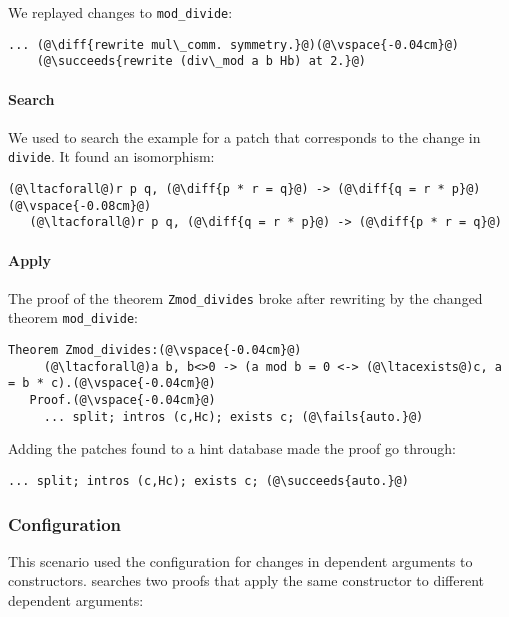 We replayed changes to \lstinline{mod_divide}:

\begin{lstlisting}[language=coq]
    ... (@\diff{rewrite mul\_comm. symmetry.}@)(@\vspace{-0.04cm}@)
    (@\succeeds{rewrite (div\_mod a b Hb) at 2.}@)
\end{lstlisting}

\paragraph{Search} We used \sysname to search the example for a patch
that corresponds to the change in \lstinline{divide}.
It found an isomorphism:

\begin{lstlisting}[language=coq]
   (@\ltacforall@)r p q, (@\diff{p * r = q}@) -> (@\diff{q = r * p}@)(@\vspace{-0.08cm}@)
   (@\ltacforall@)r p q, (@\diff{q = r * p}@) -> (@\diff{p * r = q}@)
\end{lstlisting}

\paragraph{Apply} The proof of the theorem \lstinline{Zmod_divides} broke after rewriting by the changed theorem \lstinline{mod_divide}:

\begin{lstlisting}[language=coq]
   Theorem Zmod_divides:(@\vspace{-0.04cm}@)
     (@\ltacforall@)a b, b<>0 -> (a mod b = 0 <-> (@\ltacexists@)c, a = b * c).(@\vspace{-0.04cm}@)
   Proof.(@\vspace{-0.04cm}@)
     ... split; intros (c,Hc); exists c; (@\fails{auto.}@)
\end{lstlisting}
 
Adding the patches \sysname found to a hint database made the proof go through:

\begin{lstlisting}[language=coq]
     ... split; intros (c,Hc); exists c; (@\succeeds{auto.}@)
\end{lstlisting}

\subsubsection{Configuration}

This scenario used the configuration for changes in dependent arguments to constructors.
\sysname searches two proofs that apply the same constructor
to different dependent arguments:

